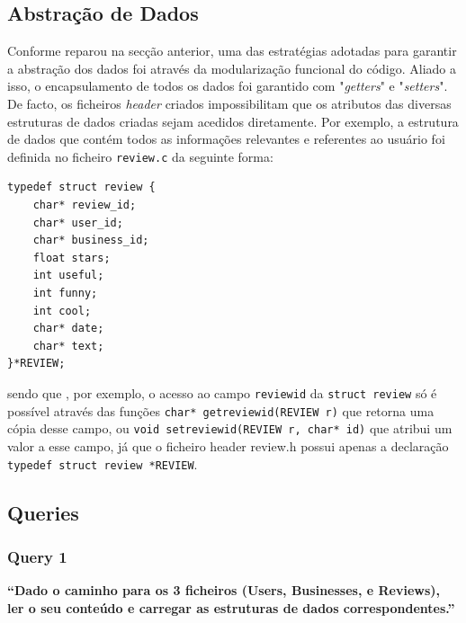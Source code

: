 \documentclass[a4paper]{article}
\begin{document}
\subsection{Abstração de Dados}
\label{sec:abstracao}

Conforme reparou na secção anterior, uma das estratégias adotadas para garantir
a abstração dos dados foi através da modularização funcional do código.
Aliado a isso, o encapsulamento de todos os dados foi garantido com "\textit{getters}" e "\textit{setters}".
De facto, os ficheiros \textit{header} criados impossibilitam
que os atributos das diversas estruturas de dados criadas sejam acedidos diretamente.
Por exemplo, a estrutura de dados que contém todos as informações relevantes e
referentes ao usuário foi definida no ficheiro \texttt{review.c} da seguinte forma:

\begin{verbatim}
typedef struct review {
    char* review_id;    
    char* user_id;      
    char* business_id;  
    float stars;        
    int useful;         
    int funny;          
    int cool;           
    char* date;         
    char* text;         
}*REVIEW;
\end{verbatim}

sendo que , por exemplo, o acesso ao campo \texttt{review\textunderscore id} da \texttt{struct review} só é possível através das 
funções \texttt{char* get\textunderscore review\textunderscore id(REVIEW r)} que retorna uma cópia desse campo,
ou \texttt{void set\textunderscore review\textunderscore id(REVIEW r, char* id)} que atribui um valor a esse campo,
já que o ficheiro header review.h possui apenas a declaração \texttt{typedef struct review *REVIEW}.


\subsection{Queries}
\label{sec:queries}


\subsubsection*{Query 1}
\label{sec:query1}

\textbf{“Dado o caminho para os 3 ficheiros (Users, Businesses, e Reviews), ler o seu
conteúdo e carregar as estruturas de dados correspondentes.”}
\end{document}
